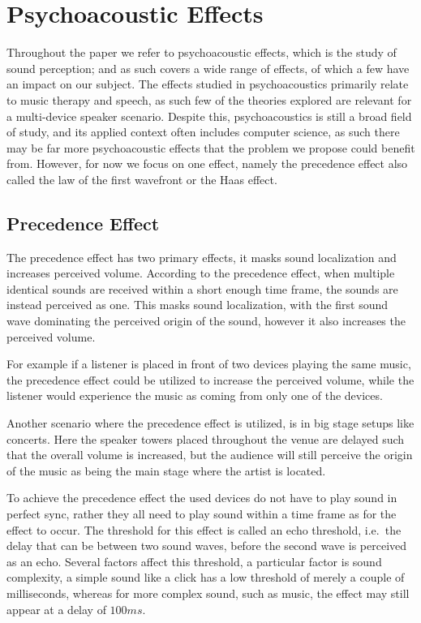 \section{Psychoacoustic Effects}\label{sec:psychoacoustic_effects}
Throughout the paper we refer to psychoacoustic effects, which is the study of sound perception;
and as such covers a wide range of effects, of which a few have an impact on our subject.
The effects studied in psychoacoustics primarily relate to music therapy and speech, as such few of the theories explored are relevant for a multi-device speaker scenario.
Despite this, psychoacoustics is still a broad field of study, and its applied context often includes computer science, as such there may be far more psychoacoustic effects that the problem we propose could benefit from.
However, for now we focus on one effect, namely the precedence effect also called the law of the first wavefront or the Haas effect.

\subsection{Precedence Effect}
The precedence effect has two primary effects, it masks sound localization and increases perceived volume.
According to the precedence effect, when multiple identical sounds are received within a short enough time frame, the sounds are instead perceived as one.
This masks sound localization, with the first sound wave dominating the perceived origin of the sound, however it also increases the perceived volume.

\bigskip
For example if a listener is placed in front of two devices playing the same music, the precedence effect could be utilized to increase the perceived volume, while the listener would experience the music as coming from only one of the devices.

Another scenario where the precedence effect is utilized, is in big stage setups like concerts.
Here the speaker towers placed throughout the venue are delayed such that the overall volume is increased, but the audience will still perceive the origin of the music as being the main stage where the artist is located.

\bigskip
To achieve the precedence effect the used devices do not have to play sound in perfect sync, rather they all need to play sound within a time frame as for the effect to occur.
The threshold for this effect is called an echo threshold, i.e.\ the delay that can be between two sound waves, before the second wave is perceived as an echo.
Several factors affect this threshold, a particular factor is sound complexity, a simple sound like a click has a low threshold of merely a couple of milliseconds, whereas for more complex sound, such as music, the effect may still appear at a delay of $100 ms$.\cite{precedence_wiki}

